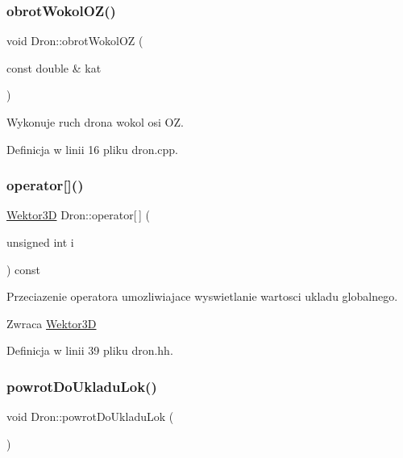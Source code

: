 \subsubsection{\texorpdfstring{obrotWokolOZ()}{obrotWokolOZ()}}
{\footnotesize\ttfamily void Dron\+::obrot\+Wokol\+OZ (\begin{DoxyParamCaption}\item[{const double \&}]{kat }\end{DoxyParamCaption})}

Wykonuje ruch drona wokol osi OZ. 

Definicja w linii 16 pliku dron.\+cpp.

\mbox{\label{class_dron_a4c0f96b6a0f2102c86088b3787cf6367}} 
\subsubsection{\texorpdfstring{operator[]()}{operator[]()}}
{\footnotesize\ttfamily \mbox{\hyperlink{class_wektor3_d}{Wektor3D}} Dron\+::operator\mbox{[}$\,$\mbox{]} (\begin{DoxyParamCaption}\item[{unsigned int}]{i }\end{DoxyParamCaption}) const\hspace{0.3cm}{\ttfamily [inline]}}

Przeciazenie operatora umozliwiajace wyswietlanie wartosci ukladu globalnego.

\begin{DoxyReturn}{Zwraca}
\mbox{\hyperlink{class_wektor3_d}{Wektor3D}} 
\end{DoxyReturn}


Definicja w linii 39 pliku dron.\+hh.

\mbox{\label{class_dron_af467b86d475587e9f389597c7fc4590d}} 
\subsubsection{\texorpdfstring{powrotDoUkladuLok()}{powrotDoUkladuLok()}}
{\footnotesize\ttfamily void Dron\+::powrot\+Do\+Ukladu\+Lok (\begin{DoxyParamCaption}{ }\end{DoxyParamCaption})}

